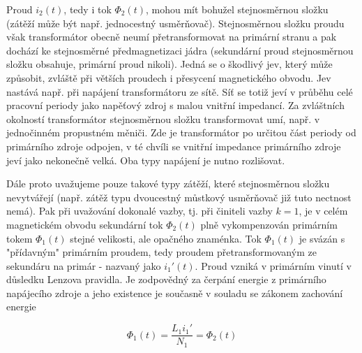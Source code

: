 
      Proud $i_2(t)$, tedy i tok $\Phi_2(t)$, mohou mít bohužel stejnosměrnou složku (zátěží může 
      být např. jednocestný usměrňovač). Stejno\-směr\-nou složku prou\-du však transformátor 
      obecně neumí pře\-trans\-form\-ovat na primární stranu a pak do\-chází ke stejnosměrné 
      před\-magnet\-izaci jádra (sekundární proud stejno\-směr\-nou složku obsahuje, primární proud 
      nikoli). Jedná se o škodlivý jev, který může způsobit, zvláště při větších proudech i 
      přesycení magnetického obvodu. Jev nastává např. při napájení transformátoru ze sítě. Síť se 
      totiž jeví v průběhu celé pracovní periody jako napěťový zdroj s malou vnitřní impedancí. Za 
      zvláštních okolností transformátor stejnosměrnou složku transformovat umí, např. v 
      jednočinném propustném měniči. Zde je transformátor po určitou část periody od primárního 
      zdroje odpojen, v té chvíli se vnitřní impedance primárního zdroje jeví jako nekonečně 
      velká. Oba typy napájení je nutno rozlišovat.

      Dále proto uvažujeme pouze takové typy zátěží, které stejnosměrnou složku ne\-vy\-tvá\-ře\-jí 
      (např. zátěž typu dvoucestný můstkový usměrňovač již tuto nectnost nemá). Pak při uvažování 
      dokonalé vazby, tj. při činiteli vazby $k=1$, je v celém magnetickém obvodu sekundární tok 
      $\Phi_2(t)$ plně vykompenzován primárním tokem $\Phi_1(t)$ stejné velikosti, ale opačného 
      znaménka. Tok $\Phi_1(t)$ je svázán s "přídavným" primárním proudem, tedy proudem 
      pře\-trans\-formovaným ze sekundáru na primár - nazvaný jako $i_1'(t)$. Proud vzniká v 
      primárním vinutí v důsledku Lenzova pravidla. Je zodpovědný za čerpání energie z primárního 
      napájecího zdroje a jeho existence je současně v souladu se zákonem zachování energie

      \begin{equation}\label{es:eq_zachovani_energie}
        \Phi_1(t)=\frac{L_1i_1'}{N_1}=\Phi_2(t)
      \end{equation}

